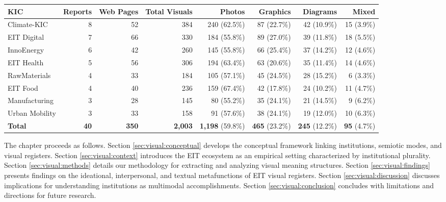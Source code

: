 \documentclass[../main.tex]{subfiles}
\begin{document}
\begin{center}
\small
\begin{tabular}{lrrrrrrr}
\toprule
\textbf{KIC} & \textbf{Reports} & \textbf{Web Pages} & \textbf{Total Visuals} & \textbf{Photos} & \textbf{Graphics} & \textbf{Diagrams} & \textbf{Mixed} \\
\midrule
Climate-KIC & 8 & 52 & 384 & 240 (62.5\%) & 87 (22.7\%) & 42 (10.9\%) & 15 (3.9\%) \\
EIT Digital & 7 & 66 & 330 & 184 (55.8\%) & 89 (27.0\%) & 39 (11.8\%) & 18 (5.5\%) \\
InnoEnergy & 6 & 42 & 260 & 145 (55.8\%) & 66 (25.4\%) & 37 (14.2\%) & 12 (4.6\%) \\
EIT Health & 5 & 56 & 306 & 194 (63.4\%) & 63 (20.6\%) & 35 (11.4\%) & 14 (4.6\%) \\
RawMaterials & 4 & 33 & 184 & 105 (57.1\%) & 45 (24.5\%) & 28 (15.2\%) & 6 (3.3\%) \\
EIT Food & 4 & 40 & 236 & 159 (67.4\%) & 42 (17.8\%) & 24 (10.2\%) & 11 (4.7\%) \\
Manufacturing & 3 & 28 & 145 & 80 (55.2\%) & 35 (24.1\%) & 21 (14.5\%) & 9 (6.2\%) \\
Urban Mobility & 3 & 33 & 158 & 91 (57.6\%) & 38 (24.1\%) & 19 (12.0\%) & 10 (6.3\%) \\
\midrule
\textbf{Total} & \textbf{40} & \textbf{350} & \textbf{2,003} & \textbf{1,198} (59.8\%) & \textbf{465} (23.2\%) & \textbf{245} (12.2\%) & \textbf{95} (4.7\%) \\
\bottomrule
\end{tabular}
\end{center}

The chapter proceeds as follows. Section \ref{sec:visual:conceptual} develops the conceptual framework linking institutions, semiotic modes, and visual registers. Section \ref{sec:visual:context} introduces the EIT ecosystem as an empirical setting characterized by institutional plurality. Section \ref{sec:visual:methods} details our methodology for extracting and analyzing visual meaning structures. Section \ref{sec:visual:findings} presents findings on the ideational, interpersonal, and textual metafunctions of EIT visual registers. Section \ref{sec:visual:discussion} discusses implications for understanding institutions as multimodal accomplishments. Section \ref{sec:visual:conclusion} concludes with limitations and directions for future research.
\end{document}
